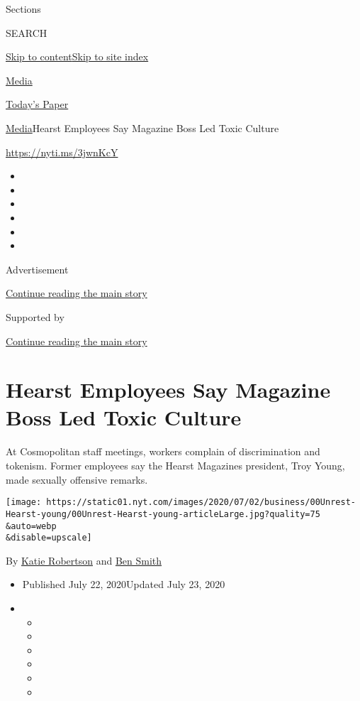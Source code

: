 Sections

SEARCH

\protect\hyperlink{site-content}{Skip to
content}\protect\hyperlink{site-index}{Skip to site index}

\href{https://www.nytimes.com/section/business/media}{Media}

\href{https://myaccount.nytimes.com/auth/login?response_type=cookie\&client_id=vi}{}

\href{https://www.nytimes.com/section/todayspaper}{Today's Paper}

\href{/section/business/media}{Media}\textbar{}Hearst Employees Say
Magazine Boss Led Toxic Culture

\url{https://nyti.ms/3jwnKcY}

\begin{itemize}
\item
\item
\item
\item
\item
\item
\end{itemize}

Advertisement

\protect\hyperlink{after-top}{Continue reading the main story}

Supported by

\protect\hyperlink{after-sponsor}{Continue reading the main story}

\hypertarget{hearst-employees-say-magazine-boss-led-toxic-culture}{%
\section{Hearst Employees Say Magazine Boss Led Toxic
Culture}\label{hearst-employees-say-magazine-boss-led-toxic-culture}}

At Cosmopolitan staff meetings, workers complain of discrimination and
tokenism. Former employees say the Hearst Magazines president, Troy
Young, made sexually offensive remarks.

\texttt{[image: https://static01.nyt.com/images/2020/07/02/business/00Unrest-Hearst-young/00Unrest-Hearst-young-articleLarge.jpg?quality=75\\\&auto=webp\\\&disable=upscale]}

By \href{https://www.nytimes.com/by/katie-robertson}{Katie Robertson}
and \href{https://www.nytimes.com/by/ben-smith}{Ben Smith}

\begin{itemize}
\item
  Published July 22, 2020Updated July 23, 2020
\item
  \begin{itemize}
  \item
  \item
  \item
  \item
  \item
  \item
  \end{itemize}
\end{itemize}

